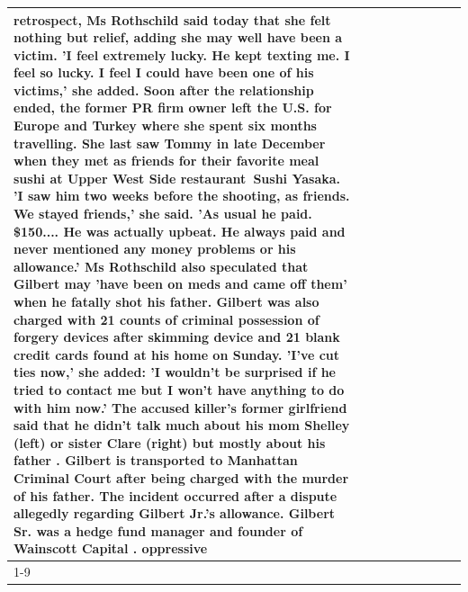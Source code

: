 \begin{table}[H]
\begin{tabular}{lllrlllll}
retrospect, Ms Rothschild said today that she felt nothing but relief, adding she may well have been a victim. 'I feel extremely lucky. He kept texting me. I feel so lucky. I feel I could have been one of his victims,' she added. Soon after the relationship ended, the former PR firm owner left the U.S. for Europe and Turkey where she spent six months  travelling. She last saw Tommy in late December when they met as friends for their favorite meal sushi at Upper West Side restaurant Sushi Yasaka. 'I saw him two weeks before the shooting, as friends. We stayed friends,' she said. 'As usual he paid. \$150.... He was actually upbeat. He always paid and never mentioned any money problems or his allowance.' Ms Rothschild also speculated that Gilbert may 'have been on meds and came off them' when he fatally shot his father. Gilbert was also charged with 21 counts of criminal possession of forgery devices after skimming device and 21 blank credit cards found at his home on Sunday. 'I've cut ties now,' she added: 'I wouldn’t be surprised if he tried to contact me but I won’t have anything to do with him now.' The accused killer's former girlfriend said that he didn't talk much about his mom Shelley (left) or sister Clare (right) but mostly about his father . Gilbert is transported to Manhattan Criminal Court  after being charged with the murder of his father. The incident occurred after a dispute allegedly regarding Gilbert Jr.'s allowance. Gilbert Sr. was a hedge fund manager and founder of Wainscott Capital . oppressive \\
\cline{1-9}

\end{tabular}
\end{table}
